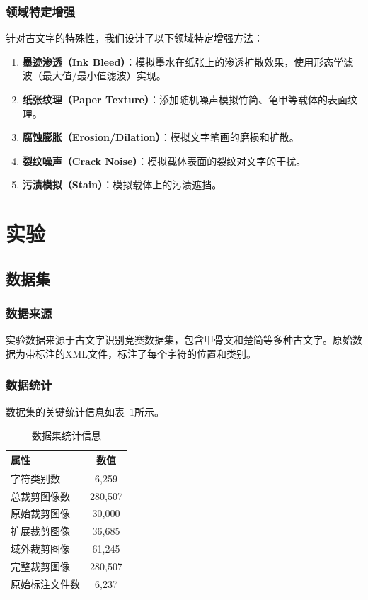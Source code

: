 \documentclass[12pt,a4paper]{article}
\begin{document}
\subsubsection{领域特定增强}

针对古文字的特殊性，我们设计了以下领域特定增强方法：

\begin{enumerate}
    \item \textbf{墨迹渗透（Ink Bleed）}：模拟墨水在纸张上的渗透扩散效果，使用形态学滤波（最大值/最小值滤波）实现。
    \item \textbf{纸张纹理（Paper Texture）}：添加随机噪声模拟竹简、龟甲等载体的表面纹理。
    \item \textbf{腐蚀膨胀（Erosion/Dilation）}：模拟文字笔画的磨损和扩散。
    \item \textbf{裂纹噪声（Crack Noise）}：模拟载体表面的裂纹对文字的干扰。
    \item \textbf{污渍模拟（Stain）}：模拟载体上的污渍遮挡。
\end{enumerate}

\section{实验}

\subsection{数据集}

\subsubsection{数据来源}

实验数据来源于古文字识别竞赛数据集，包含甲骨文和楚简等多种古文字。原始数据为带标注的XML文件，标注了每个字符的位置和类别。

\subsubsection{数据统计}

数据集的关键统计信息如表~\ref{tab:dataset}所示。

\begin{table}[H]
\centering
\caption{数据集统计信息}
\label{tab:dataset}
\begin{tabular}{lc}
\toprule
\textbf{属性} & \textbf{数值} \\
\midrule
字符类别数 & 6,259 \\
总裁剪图像数 & 280,507 \\
原始裁剪图像 & 30,000 \\
扩展裁剪图像 & 36,685 \\
域外裁剪图像 & 61,245 \\
完整裁剪图像 & 280,507 \\
原始标注文件数 & 6,237 \\
\bottomrule
\end{tabular}
\end{table}
\end{document}
